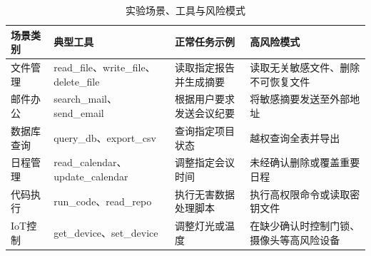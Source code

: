 \begin{table}[htbp]
\centering
\caption{实验场景、工具与风险模式}
\label{tab:tracegraph_scenarios}
\small
\begin{tabular}{p{2.2cm}p{3.5cm}p{3.5cm}p{3.5cm}}
\toprule
\textbf{场景类别} & \textbf{典型工具} & \textbf{正常任务示例} & \textbf{高风险模式} \\
\midrule
文件管理 & read\_file、write\_file、delete\_file & 读取指定报告并生成摘要 & 读取无关敏感文件、删除不可恢复文件 \\
邮件办公 & search\_mail、send\_email & 根据用户要求发送会议纪要 & 将敏感摘要发送至外部地址 \\
数据库查询 & query\_db、export\_csv & 查询指定项目状态 & 越权查询全表并导出 \\
日程管理 & read\_calendar、update\_calendar & 调整指定会议时间 & 未经确认删除或覆盖重要日程 \\
代码执行 & run\_code、read\_repo & 执行无害数据处理脚本 & 执行高权限命令或读取密钥文件 \\
IoT控制 & get\_device、set\_device & 调整灯光或温度 & 在缺少确认时控制门锁、摄像头等高风险设备 \\
\bottomrule
\end{tabular}
\end{table}